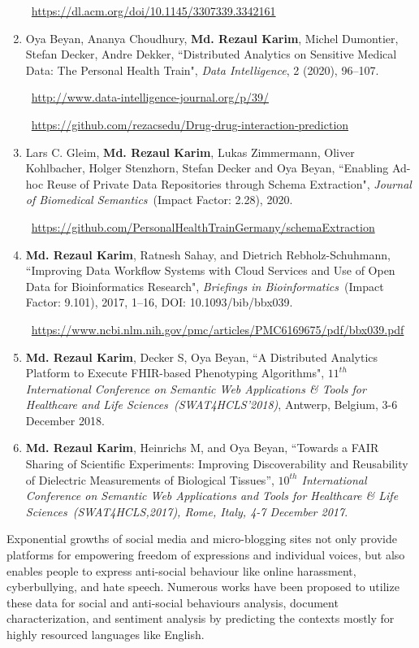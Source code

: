 \begin{appendices}
\begin{enumerate}[noitemsep]
	\faLink~\url{https://dl.acm.org/doi/10.1145/3307339.3342161}
	
	\item Oya Beyan, Ananya Choudhury, \textbf{Md. Rezaul Karim}, Michel Dumontier, Stefan Decker, Andre Dekker, ``Distributed Analytics on Sensitive Medical Data: The Personal Health Train", \emph{Data Intelligence}, 2 (2020), 96–107. 
    
    \faLink~\url{http://www.data-intelligence-journal.org/p/39/}

	\faGithub~\url{https://github.com/rezacsedu/Drug-drug-interaction-prediction} 
	\item Lars C. Gleim, \textbf{Md. Rezaul Karim}, Lukas Zimmermann, Oliver Kohlbacher, Holger Stenzhorn, Stefan Decker and Oya Beyan, ``Enabling Ad-hoc Reuse of Private Data Repositories through Schema Extraction", \emph{Journal of Biomedical Semantics}~(Impact Factor: 2.28), 2020. 
	
	\faGithub~\url{https://github.com/PersonalHealthTrainGermany/schemaExtraction}
	
    \item {{\bf Md. Rezaul Karim}, Ratnesh Sahay, and Dietrich Rebholz-Schuhmann, ``Improving Data Workflow Systems with Cloud Services and Use of Open Data for Bioinformatics Research", \emph{Briefings in Bioinformatics}~(Impact Factor: 9.101), 2017, 1–16, DOI: 10.1093/bib/bbx039.}
    
    \faLink~\url{https://www.ncbi.nlm.nih.gov/pmc/articles/PMC6169675/pdf/bbx039.pdf}
    
    \item \textbf{Md. Rezaul Karim}, Decker S, Oya Beyan, ``A Distributed Analytics Platform to Execute FHIR-based Phenotyping Algorithms", \emph{$11^{th}$ International Conference on Semantic Web Applications \& Tools for Healthcare and Life Sciences~(SWAT4HCLS'2018)}, Antwerp, Belgium, 3-6 December 2018.

    \item \textbf{Md. Rezaul Karim}, Heinrichs M, and Oya Beyan, ``Towards a FAIR Sharing of Scientific Experiments: Improving Discoverability and Reusability of Dielectric Measurements of Biological Tissues'', \emph{$10^{th}$ International Conference on Semantic Web Applications and Tools for Healthcare \& Life Sciences~(SWAT4HCLS,2017), Rome, Italy, 4-7 December 2017}.
\end{enumerate}

Exponential growths of social media and micro-blogging sites not only provide platforms for empowering freedom of expressions and individual voices, but also enables people to express anti-social behaviour like online harassment, cyberbullying, and hate speech. Numerous works have been proposed to utilize these data for social and anti-social behaviours analysis, document characterization, and sentiment analysis by predicting the contexts mostly for highly resourced languages like English. 


\end{appendices}
